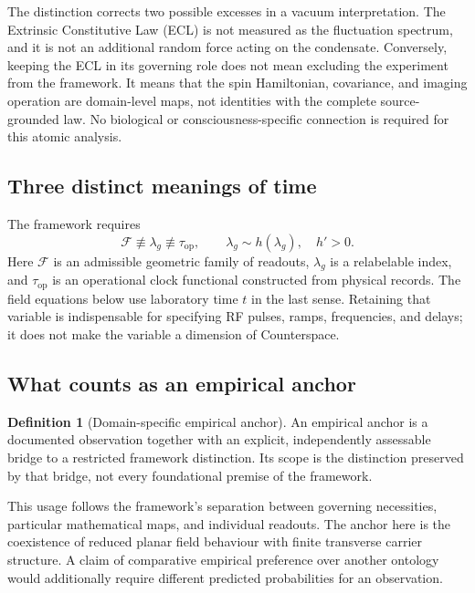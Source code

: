\documentclass[11pt,a4paper]{article}
\theoremstyle{definition}
\newtheorem{definition}[proposition]{Definition}
\theoremstyle{remark}
\newcommand{\topc}{\tau_{\mathrm{op}}}
\begin{document}
The distinction corrects two possible excesses in a vacuum interpretation. The Extrinsic Constitutive Law (ECL) is not measured as the fluctuation spectrum, and it is not an additional random force acting on the condensate. Conversely, keeping the ECL in its governing role does not mean excluding the experiment from the framework. It means that the spin Hamiltonian, covariance, and imaging operation are domain-level maps, not identities with the complete source-grounded law. No biological or consciousness-specific connection is required for this atomic analysis.\cite{foundation}

\subsection{Three distinct meanings of time}
The framework requires
\begin{equation}
 \mathcal F\not\equiv\lambda_g\not\equiv\topc,
 \qquad \lambda_g\sim h(\lambda_g),\quad h'>0.
 \label{eq:time_types}
\end{equation}
Here $\mathcal F$ is an admissible geometric family of readouts, $\lambda_g$ is a relabelable index, and $\topc$ is an operational clock functional constructed from physical records. The field equations below use laboratory time $t$ in the last sense. Retaining that variable is indispensable for specifying RF pulses, ramps, frequencies, and delays; it does not make the variable a dimension of Counterspace.\cite{foundation,minkowski}

\subsection{What counts as an empirical anchor}
\begin{definition}[Domain-specific empirical anchor]
An empirical anchor is a documented observation together with an explicit, independently assessable bridge to a restricted framework distinction. Its scope is the distinction preserved by that bridge, not every foundational premise of the framework.
\end{definition}
This usage follows the framework's separation between governing necessities, particular mathematical maps, and individual readouts. The anchor here is the coexistence of reduced planar field behaviour with finite transverse carrier structure. A claim of comparative empirical preference over another ontology would additionally require different predicted probabilities for an observation.\cite{foundation,planck}
\end{document}
